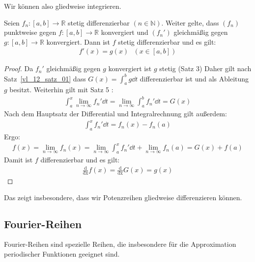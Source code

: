 \begin{Bemerkung}{
	Wir können also gliedweise integrieren.
}\end{Bemerkung}

\begin{Satz}{
	Seien $f_n : [a,b] \rightarrow \mathbb{R}$ stetig differenzierbar $(n \in 
	\mathbb{N})$. Weiter gelte, dass $(f_n)$ punktweise gegen $f:[a,b] \rightarrow 
	\mathbb{R}$ konvergiert und $(f_n')$ gleichmäßig gegen 
	$g:[a,b] \rightarrow \mathbb{R}$ konvergiert. Dann ist $f$ stetig 
	differenzierbar und es gilt:
	\begin{align*}
		f'(x) = g(x) \text{ } (x \in [a,b])
	\end{align*}
}\end{Satz}

\begin{proof}
	Da $f_n'$ gleichmäßig gegen $g$ konvergiert ist $g$ stetig (Satz 3) 
	Daher gilt nach Satz~\ref{vl_12_satz_01} dass 
	$G(x) = \int_a^b g \dd{t}$ differenzierbar ist und als Ableitung $g$ besitzt. 
	Weiterhin gilt mit Satz 5 :
	\begin{align*}
		\int_a^x \lim\limits_{n \rightarrow \infty}{f_n'} \dd{t} = 
		\lim\limits_{n\rightarrow \infty}{\int_a^b f_n' \dd{t}} = G(x)
	\end{align*}
	Nach dem Hauptsatz der Differential und Integralrechnung gilt außerdem:
	\begin{align*}
		\int_a^x f_n' \dd{t} = f_n(x) -f_n(a) 
	\end{align*}
	Ergo:
	\begin{align*}
		f(x) = \lim\limits_{n \rightarrow \infty}{f_n(x)} = 
		\lim\limits_{n \rightarrow \infty} \int_a^x f_n' \dd{t} + 
		\lim\limits_{n \rightarrow \infty}{f_n(a)} = G(x) + f(a)
	\end{align*}
	Damit ist $f$ differenzierbar und es gilt: 
	\begin{align*}
		\frac{\mathrm{d}}{\mathrm{dx}}f(x) 
	= \frac{\mathrm{d}}{\mathrm{dx}}G(x) = g(x)
	\end{align*}		
\end{proof}

\begin{Bemerkung}{
	Das zeigt insbesondere, dass wir Potenzreihen gliedweise differenzieren können.
}\end{Bemerkung}

\subsection{Fourier-Reihen}
Fourier-Reihen sind spezielle Reihen, die insbesondere für die Approximation 
periodischer Funktionen geeignet sind. 

